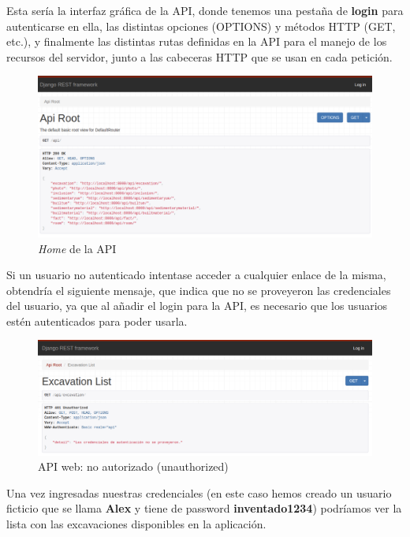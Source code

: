 Esta sería la interfaz gráfica de la API, donde tenemos una pestaña de \textbf{login} para
autenticarse en ella, las distintas opciones (OPTIONS) y métodos HTTP (GET, etc.), y
finalmente las distintas rutas definidas en la API para el manejo de los recursos del
servidor, junto a las cabeceras HTTP que se usan en cada petición.

        \begin{figure}[H]
            \centering
            \includegraphics[scale=0.30]{imagenes/root-api.png}
            \caption{\textit{Home} de la API}
            \label{fig:root-api}
        \end{figure}

Si un usuario no autenticado intentase acceder a cualquier enlace de la misma, obtendría el
siguiente mensaje, que indica que no se proveyeron las credenciales del usuario, ya que al
añadir el login para la API, es necesario que los usuarios estén autenticados para poder
usarla.

        \begin{figure}[H]
            \centering
            \includegraphics[scale=0.30]{imagenes/unauthorized.png}
            \caption{API web: no autorizado (unauthorized)}
            \label{fig:unauthorized}
        \end{figure}

Una vez ingresadas nuestras credenciales (en este caso hemos creado un usuario ficticio que
se llama \textbf{Alex} y tiene de password \textbf{inventado1234}) podríamos ver la lista
con las excavaciones disponibles en la aplicación.

